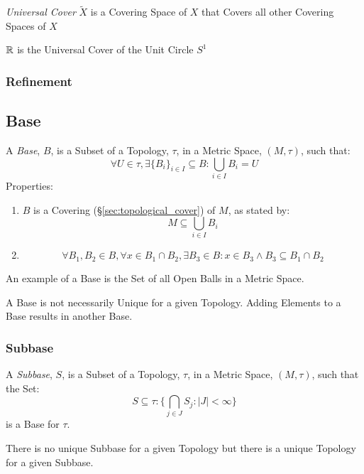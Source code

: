 \emph{Universal Cover} $\tilde{X}$ is a Covering Space of $X$ that
Covers all other Covering Spaces of $X$

$\mathbb{R}$ is the Universal Cover of the Unit Circle $S^1$




\subsubsection{Refinement}\label{sec:refinement}



\subsection{Base}\label{sec:topological_base}

A \emph{Base}, $B$, is a Subset of a Topology, $\tau$, in a Metric
Space, $(M,\tau)$, such that:
\[
  \forall U \in \tau, \exists \{B_i\}_{i \in I} \subseteq B :
  \bigcup_{i \in I}B_i = U
\]
Properties:
\begin{enumerate}
  \item $B$ is a Covering (\S\ref{sec:topological_cover}) of $M$, as
    stated by:
\[
  M \subseteq \bigcup_{i \in I} B_i
\]

  \item
\[
  \forall B_1, B_2 \in B, \forall x \in B_1 \cap B_2,
  \exists B_3 \in B : x \in B_3 \wedge B_3 \subseteq B_1 \cap B_2
\]

\end{enumerate}
An example of a Base is the Set of all Open Balls in a Metric Space.

A Base is not necessarily Unique for a given Topology. Adding Elements
to a Base results in another Base.



\subsubsection{Subbase}\label{sec:subbase}

A \emph{Subbase}, $S$, is a Subset of a Topology, $\tau$, in a Metric
Space, $(M,\tau)$, such that the Set:
\[
  S \subseteq \tau : \{ \bigcap_{j \in J} S_j : |J| < \infty \}
\]
is a Base for $\tau$.

There is no unique Subbase for a given Topology but there is a unique
Topology for a given Subbase.



